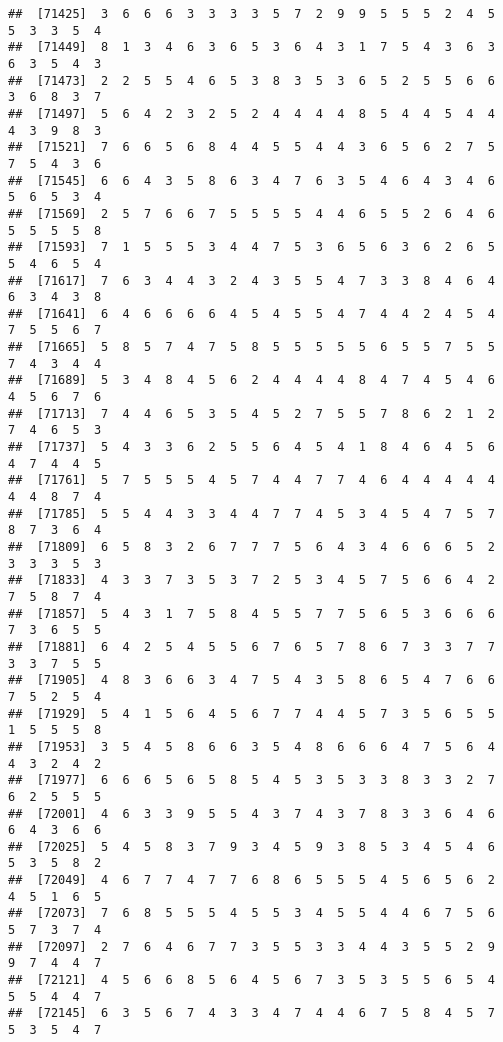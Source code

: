 \documentclass[
]{book}
\begin{document}
\begin{verbatim}
##  [71425]  3  6  6  6  3  3  3  3  5  7  2  9  9  5  5  5  2  4  5  5  3  3  5  4
##  [71449]  8  1  3  4  6  3  6  5  3  6  4  3  1  7  5  4  3  6  3  6  3  5  4  3
##  [71473]  2  2  5  5  4  6  5  3  8  3  5  3  6  5  2  5  5  6  6  3  6  8  3  7
##  [71497]  5  6  4  2  3  2  5  2  4  4  4  4  8  5  4  4  5  4  4  4  3  9  8  3
##  [71521]  7  6  6  5  6  8  4  4  5  5  4  4  3  6  5  6  2  7  5  7  5  4  3  6
##  [71545]  6  6  4  3  5  8  6  3  4  7  6  3  5  4  6  4  3  4  6  5  6  5  3  4
##  [71569]  2  5  7  6  6  7  5  5  5  5  4  4  6  5  5  2  6  4  6  5  5  5  5  8
##  [71593]  7  1  5  5  5  3  4  4  7  5  3  6  5  6  3  6  2  6  5  5  4  6  5  4
##  [71617]  7  6  3  4  4  3  2  4  3  5  5  4  7  3  3  8  4  6  4  6  3  4  3  8
##  [71641]  6  4  6  6  6  6  4  5  4  5  5  4  7  4  4  2  4  5  4  7  5  5  6  7
##  [71665]  5  8  5  7  4  7  5  8  5  5  5  5  5  6  5  5  7  5  5  7  4  3  4  4
##  [71689]  5  3  4  8  4  5  6  2  4  4  4  4  8  4  7  4  5  4  6  4  5  6  7  6
##  [71713]  7  4  4  6  5  3  5  4  5  2  7  5  5  7  8  6  2  1  2  7  4  6  5  3
##  [71737]  5  4  3  3  6  2  5  5  6  4  5  4  1  8  4  6  4  5  6  4  7  4  4  5
##  [71761]  5  7  5  5  5  4  5  7  4  4  7  7  4  6  4  4  4  4  4  4  4  8  7  4
##  [71785]  5  5  4  4  3  3  4  4  7  7  4  5  3  4  5  4  7  5  7  8  7  3  6  4
##  [71809]  6  5  8  3  2  6  7  7  7  5  6  4  3  4  6  6  6  5  2  3  3  3  5  3
##  [71833]  4  3  3  7  3  5  3  7  2  5  3  4  5  7  5  6  6  4  2  7  5  8  7  4
##  [71857]  5  4  3  1  7  5  8  4  5  5  7  7  5  6  5  3  6  6  6  7  3  6  5  5
##  [71881]  6  4  2  5  4  5  5  6  7  6  5  7  8  6  7  3  3  7  7  3  3  7  5  5
##  [71905]  4  8  3  6  6  3  4  7  5  4  3  5  8  6  5  4  7  6  6  7  5  2  5  4
##  [71929]  5  4  1  5  6  4  5  6  7  7  4  4  5  7  3  5  6  5  5  1  5  5  5  8
##  [71953]  3  5  4  5  8  6  6  3  5  4  8  6  6  6  4  7  5  6  4  4  3  2  4  2
##  [71977]  6  6  6  5  6  5  8  5  4  5  3  5  3  3  8  3  3  2  7  6  2  5  5  5
##  [72001]  4  6  3  3  9  5  5  4  3  7  4  3  7  8  3  3  6  4  6  6  4  3  6  6
##  [72025]  5  4  5  8  3  7  9  3  4  5  9  3  8  5  3  4  5  4  6  5  3  5  8  2
##  [72049]  4  6  7  7  4  7  7  6  8  6  5  5  5  4  5  6  5  6  2  4  5  1  6  5
##  [72073]  7  6  8  5  5  5  4  5  5  3  4  5  5  4  4  6  7  5  6  5  7  3  7  4
##  [72097]  2  7  6  4  6  7  7  3  5  5  3  3  4  4  3  5  5  2  9  9  7  4  4  7
##  [72121]  4  5  6  6  8  5  6  4  5  6  7  3  5  3  5  5  6  5  4  5  5  4  4  7
##  [72145]  6  3  5  6  7  4  3  3  4  7  4  4  6  7  5  8  4  5  7  5  3  5  4  7

\end{verbatim}
\end{document}
